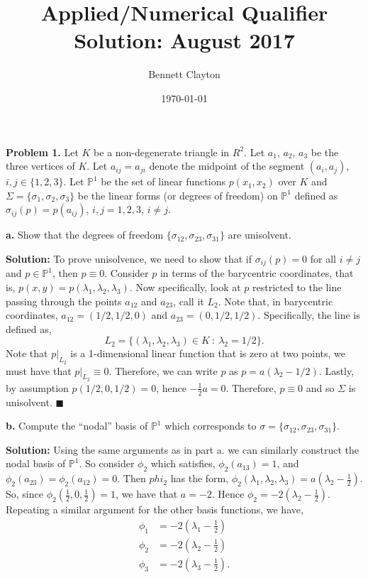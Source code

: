 \documentclass[11pt]{article}
\title{Applied/Numerical Qualifier Solution: August 2017}
\author{Bennett Clayton}
\affil{Texas A\&M University}
\date{\today}
\begin{document}
\maketitle

\textbf{Problem 1.} Let $K$ be a non-degenerate triangle in $R^2$.
Let $a_1$, $a_2$, $a_3$ be the three vertices of $K$.
Let $a_{ij} = a_{ji}$ denote the midpoint of the segment $(a_i,a_j)$, $i,j \in \{ 1, 2, 3\}$.
Let $\mathbb{P}^1$ be the set of linear functions $p(x_1,x_2)$ over $K$ and $\Sigma = \{\sigma_1, \sigma_2, \sigma_3 \}$ be the linear forms (or degrees of freedom)  on $\mathbb{P}^1$ defined as $\sigma_{ij}(p) = p(a_{ij})$, $i,j= 1,2,3$, $i \neq j$. 

\vskip 1cm


\textbf{a.} Show that the degrees of freedom $\{\sigma_{12},\sigma_{23}, \sigma_{31} \}$ are unisolvent.


\vskip 1cm


\textbf{Solution:} To prove unisolvence, we need to show that if $\sigma_{ij}(p) = 0$ for all $i \neq j$ and $p \in \mathbb{P}^1$, then $p \equiv 0$.
Consider $p$ in terms of the barycentric coordinates, that is, $p(x,y) = p(\lambda_1, \lambda_2, \lambda_3)$.
Now specifically, look at $p$ restricted to the line passing through the points $a_{12}$ and $a_{23}$, call it $L_2$.
Note that, in barycentric coordinates, $a_{12} = (1/2, 1/2, 0)$ and $a_{23} = (0, 1/2, 1/2)$.
Specifically, the line is defined as,
\begin{equation*}
    L_2 = \{ (\lambda_1, \lambda_2, \lambda_3) \in K \: : \: \lambda_2 = 1/2 \}.
\end{equation*}
Note that $p|_{L_2}$ is a 1-dimensional linear function that is zero at two points, we must have that $p|_{L_2} \equiv 0$.
Therefore, we can write $p$ as $p = a(\lambda_2 - 1/2)$.
Lastly, by assumption $p(1/2, 0, 1/2) = 0$, hence $-\frac{1}{2}a = 0$.
Therefore, $p \equiv 0$ and so $\Sigma$ is unisolvent.
$\blacksquare$



\vskip 2cm



\textbf{b.} Compute the “nodal” basis of $\mathbb{P}^1$ which corresponds to $\sigma = \{\sigma_{12},\sigma_{23}, \sigma_{31} \}$. 


\vskip 1cm


\textbf{Solution:} Using the same arguments as in part a. we can similarly construct the nodal basis of $\mathbb{P}^1$. 
So consider $\phi_2$ which satisfies, $\phi_2(a_{13}) = 1$, and $\phi_2(a_{23}) = \phi_2(a_{12}) = 0$.
Then $phi_2$ has the form, $\phi_2(\lambda_1, \lambda_2, \lambda_3) = a(\lambda_2 - \frac{1}{2})$.
So, since $\phi_2(\frac{1}{2}, 0, \frac{1}{2}) = 1$, we have that $a = -2$.
Hence $\phi_2 = -2(\lambda_2 - \frac{1}{2})$.
Repeating a similar argument for the other basis functions, we have,
\begin{align*}
    \phi_1 &= -2(\lambda_1 - \frac{1}{2}) \\
    \phi_2 &= -2(\lambda_2 - \frac{1}{2}) \\
    \phi_3 &= -2(\lambda_3 - \frac{1}{2}).
\end{align*}
\end{document}
